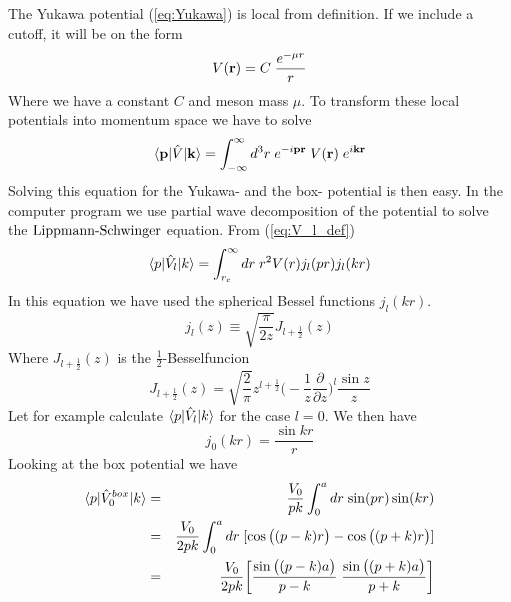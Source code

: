 The Yukawa potential (\ref{eq:Yukawa}) is local from definition. If we include a cutoff, it will be on the form
\begin{equation}
V({\bf r})=
C\;\frac{e^{-{ \mu r}}}{{ r}} 
\end{equation}
%
Where we have a constant $C$ and meson mass $\mu$. 
To transform these local potentials into momentum space we have to solve
\begin{equation} 
\langle{{\bf p}}|{\hat{V}}|{\bf k}\rangle =\int^{\infty}_{-\infty}d^3r
\;e^{-i{\bf pr}}\;V({\bf r})\;e^{i{\bf kr}}
\end{equation} 
%
Solving this equation for the Yukawa- and the box- potential is then easy.
\nl
In the computer program we use partial wave decomposition of the potential to solve the $\text{Lippmann-Schwinger}$ equation.
From (\ref{eq:V_l_def})
\begin{equation}\label{eq:V_l_def6}
\braketm{{ p}}{{\op{V}}_l}{{ k}}=
\int^{\infty}_{r_{c}}dr\;r^2 V({ r}) j_{l}(pr)j_{l}(kr)
\end{equation}
%
In this equation we have used the spherical Bessel functions $j_{l}(kr)$. 
\begin{equation}
j_{l}(z)\equiv \sqrt{\frac{\pi}{2z}}J_{l+\frac{1}{2}}(z)
\end{equation}
%
Where $J_{l+\frac{1}{2}}(z)$ is the $\frac{1}{2}$-Besselfuncion
\begin{equation}
J_{l+\frac{1}{2}}(z)=\sqrt{\frac{2}{\pi}}z^{l+\frac{1}{2}}\bigg(-\frac{1}{z}\frac{\partial}{\partial z}\bigg)^l \frac{\sin z}{z}
\end{equation}
\nl
\nl
Let for example calculate $\langle{ p}|{\hat{V}}_l|{ k}\rangle$ for the case $l=0$. 
We then have
\begin{equation}
j_{0}(kr)=\frac{\sin kr}{r}
\end{equation}
%
Looking at the box potential we have
\begin{eqnarray}\label{eq:boxpotpk}
\braketm{{ p}}{{{\op{V}}_0}^{box}}{{ k}}
&=&
\frac{V_0}{pk}\int^{a}_{0}dr\; {\sin (pr)\sin (kr)}\nonumber\\
&=&
\frac{V_0}{2pk}\int^{a}_{0}dr\;[ {\cos{\big((p-k)r\big)}-\cos{\big((p+k)r\big)}}]\nonumber\\
&=&
\frac{V_0}{2pk}\bigg[ \frac{\sin{\big((p-k)a\big)}}{p-k}\;\frac{\sin{\big((p+k)a\big)}}{p+k}\bigg]
\end{eqnarray}
